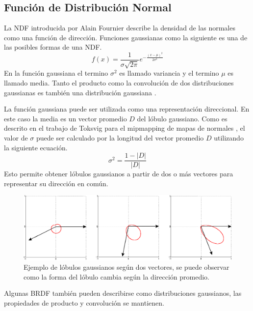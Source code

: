 \subsection{Función de Distribución Normal}
La \ac{NDF} introducida por Alain Fournier \cite{fournier1992d} describe la densidad de las normales como una función de dirección. Funciones gaussianas como la siguiente es una de las posibles formas de una \ac{NDF}.
\begin{equation}
    f(x) = \frac{1}{\sigma\sqrt{2\pi}}e^{-\frac{(x-\mu)^2}{2\sigma^2}}
    \label{eq:ndf_ex1}
\end{equation}
En la función gaussiana el termino $\sigma^2$ es llamado variancia y el termino $\mu$ es llamado media. Tanto el producto como la convolución de dos distribuciones gaussianas es también una distribución gaussiana \cite{tina-2003}.

La función gaussiana puede ser utilizada como una representación direccional. En este caso la media es un vector promedio $D$ del lóbulo gaussiano. Como es descrito en el trabajo de Toksvig para el mipmapping de mapas de normales \cite{Toksvig05}, el valor de $\sigma$ puede ser calculado por la longitud del vector promedio $D$ utilizando la siguiente ecuación.
\begin{equation}
    \sigma^2 = \frac{1-|D|}{|D|}
    \label{eq:gaussia_eq}
\end{equation}
Esto permite obtener lóbulos gaussianos a partir de dos o más vectores para representar su dirección en común.

\begin{figure}[H]
	\centering
	\includegraphics[width=0.85\linewidth]{media/lobes.eps}
	\caption{Ejemplo de lóbulos gaussianos según dos vectores, se puede observar como la forma del lóbulo cambia según la dirección promedio.}
	\label{fig:lobes_example}
\end{figure}

Algunas \ac{BRDF} también pueden describirse como distribuciones gaussianos, las propiedades de producto y convolución se mantienen.

